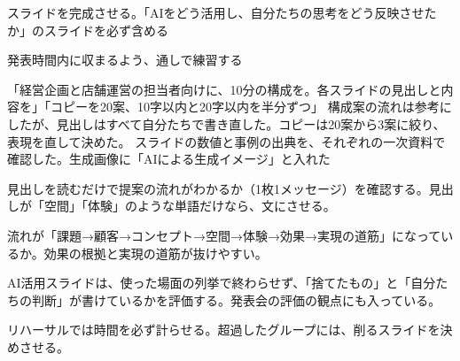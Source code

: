 \begin{nexttime}
  \item スライドを完成させる。「AIをどう活用し、自分たちの思考をどう反映させたか」のスライドを必ず含める
  \item 発表時間内に収まるよう、通しで練習する
\end{nexttime}
{「経営企画と店舗運営の担当者向けに、10分の構成を。各スライドの見出しと内容を」「コピーを20案、10字以内と20字以内を半分ずつ」}
{構成案の流れは参考にしたが、見出しはすべて自分たちで書き直した。コピーは20案から3案に絞り、表現を直して決めた。}
{スライドの数値と事例の出典を、それぞれの一次資料で確認した。生成画像に「AIによる生成イメージ」と入れた}

\begin{point}
  \item 見出しを読むだけで提案の流れがわかるか（1枚1メッセージ）を確認する。見出しが「空間」「体験」のような単語だけなら、文にさせる。
  \item 流れが「課題→顧客→コンセプト→空間→体験→効果→実現の道筋」になっているか。効果の根拠と実現の道筋が抜けやすい。
  \item AI活用スライドは、使った場面の列挙で終わらせず、「捨てたもの」と「自分たちの判断」が書けているかを評価する。発表会の評価の観点にも入っている。
  \item リハーサルでは時間を必ず計らせる。超過したグループには、削るスライドを決めさせる。
\end{point}
